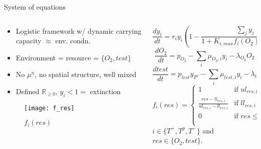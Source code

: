 \begin{frame}{System of equations}
  \begin{columns}
    \begin{column}{0.45\textwidth}
      \begin{itemize}
        \item Logistic framework w/ dynamic carrying capacity $\approx$ env. condn.
        \item Environment = resource = $\{O_2,test\}$
        \item No $\mu^n$, no spatial structure, well mixed
        \item Defined $\mathbb{R}_{\geq 0}$, $y_i < 1 =$ extinction
      \end{itemize}
      \begin{figure}[h]
        \centering
        \texttt{[image: f\_res]}
        \caption{$f_i(res)$}
      \end{figure}
    \end{column}
    \begin{column}{0.55\textwidth}
      \begin{equation}
        \frac{dy_i}{dt} = r_i y_i (1 - \frac{\sum_j y_j}{1 + K_{i,max} f_i(O_2) f_i(test)} )- \delta_i y_i
        \label{celleq}
      \end{equation}
      \begin{equation}
        \frac{dO_2}{dt} = p_{O_2} - \sum_i \mu_{O_2,i} y_i - \lambda_{O_2} O_2
        \label{o2eq}
      \end{equation}
      \begin{equation}
        \frac{dtest}{dt} = p_{test} y_{T^p} - \sum_i \mu_{test,i} y_i - \lambda_{test} test
        \label{testeq}
      \end{equation}
      \begin{equation}
        f_i(res) = \begin{cases}
          1 &\text{if } ul_{res,i} \leq res\\
          \frac{res-ll_{res,i}}{ul_{res,i}-ll_{res,i}} &\text{if } ll_{res,i} < res < ul_{res,i}\\
          0 &\text{if } res \leq ll_{res,i}\\
        \end{cases}
        \label{freseq}
      \end{equation}
      $i \in \{T^+,T^p,T^-\}$ and $res \in \{O_2,test\}$.
    \end{column}
  \end{columns}
\end{frame}
